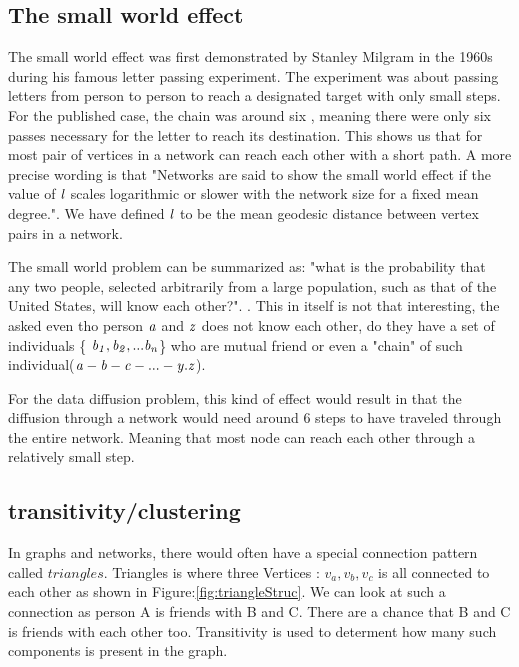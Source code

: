 \subsection{The small world effect}\label{sec:SmallWorldEffect}

The small world effect was first demonstrated by Stanley Milgram in the 1960s during his famous letter passing experiment\cite{SmallWorldProblemSmilgram1960}. The experiment was about passing letters from person to person to reach a designated target with only small steps. For the published case, the chain was around six \cite{Experiment1969}, meaning there were only six passes necessary for the letter to reach its destination. This shows us that for most pair of vertices in a network can reach each other with a short path. A more precise wording is that "Networks are said to show the small world effect if the value of $\it{l}$ scales logarithmic or slower with the network size for a fixed mean degree."\cite{ComplexNetwork2003}. We have defined $\it{l} $ to be the mean geodesic distance between vertex pairs in a network.

The small world problem can be summarized as: "what is the probability that any two people, selected arbitrarily from a large population, such as that of the United States, will know each other?". \cite{smallworldExperiment1969}. This in itself is not that interesting, the \cite{SmallworldExperiment1969} asked even tho  person $\it{a}$ and $\it{z}$ does not know each other, do they have a set of individuals \{ $\it {b_1, b_2, ... b_n} $\} who are mutual friend or even a "chain" of such individual($\it {a-b-c-...-y.z}$).

For the data diffusion problem, this kind of effect would result in that the diffusion through a network would need around 6 steps to have traveled through the entire network. Meaning that most node can reach each other through a relatively small step.

\subsection{transitivity/clustering}
In graphs and networks, there would often have a special connection pattern called $triangles$. Triangles is where three Vertices : $v_a,v_b,v_c$ is all connected to each other as shown in Figure:\ref{fig:triangleStruc}. We can look at such a connection as person A is friends with B and C. There are a chance that B and C is friends with each other too. Transitivity is used to determent how many such components is present in the graph.  

